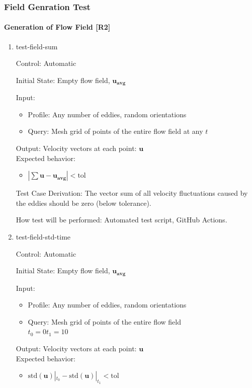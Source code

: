 \documentclass[12pt, titlepage]{article}
\begin{document}
\newpage
\subsubsection{Field Genration Test} \label{FieldGenTest}
\paragraph{Generation of Flow Field [R2]}

\begin{enumerate}

  \item{test-field-sum\\}

  Control: Automatic
            
  Initial State: Empty flow field, $\mathbf{u_{avg}}$
            
  Input:
  \begin{itemize}
    \item Profile: Any number of eddies, random orientations
    \item Query: Mesh grid of points of the entire flow field at any $t$
  \end{itemize}
  Output: Velocity vectors at each point: $\mathbf{u}$\\
  Expected behavior:
  \begin{itemize}
    \item $|\sum\mathbf{u}-\mathbf{u_{avg}}| < \text{tol}$
  \end{itemize}

  Test Case Derivation: The vector sum of all velocity fluctuations caused by the eddies should be zero (below tolerance).
            
  How test will be performed: Automated test script, GitHub Actions.

  \item{test-field-std-time\\}

  Control: Automatic
            
  Initial State: Empty flow field, $\mathbf{u_{avg}}$
            
  Input:
  \begin{itemize}
    \item Profile: Any number of eddies, random orientations
    \item Query: Mesh grid of points of the entire flow field\\
    $t_0=0$\tab$t_1=10$
  \end{itemize}
  Output: Velocity vectors at each point: $\mathbf{u}$\\
  Expected behavior:
  \begin{itemize}
    \item $\text{std}(\mathbf{u})|_{t_0} - \text{std}(\mathbf{u})|_{t_1} < \text{tol}$
  \end{itemize}


\end{enumerate}
\end{document}
